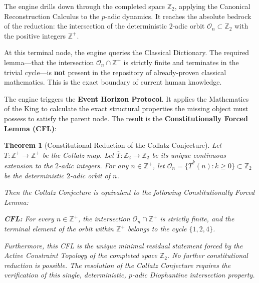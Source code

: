 \documentclass[12pt,openany]{extbook}
\theoremstyle{plain}
\newtheorem{theorem}{Theorem}[chapter]
\theoremstyle{definition}
\begin{document}
The engine drills down through the completed space $\mathbb{Z}_2$, applying the Canonical Reconstruction Calculus to the $p$-adic dynamics. It reaches the absolute bedrock of the reduction: the intersection of the deterministic $2$-adic orbit $\mathcal{O}_n \subset \mathbb{Z}_2$ with the positive integers $\mathbb{Z}^+$.

At this terminal node, the engine queries the Classical Dictionary. The required lemma---that the intersection $\mathcal{O}_n \cap \mathbb{Z}^+$ is strictly finite and terminates in the trivial cycle---is \textbf{not} present in the repository of already-proven classical mathematics. This is the exact boundary of current human knowledge.

The engine triggers the \textbf{Event Horizon Protocol}. It applies the Mathematics of the King to calculate the exact structural properties the missing object must possess to satisfy the parent node. The result is the \textbf{Constitutionally Forced Lemma (CFL)}:

\vspace{\intextsep}
\noindent\hrulefill
\vspace{\intextsep}

\begin{theorem}[Constitutional Reduction of the Collatz Conjecture]
Let $T: \mathbb{Z}^+ \to \mathbb{Z}^+$ be the Collatz map. Let $\overline{T}: \mathbb{Z}_2 \to \mathbb{Z}_2$ be its unique continuous extension to the $2$-adic integers. For any $n \in \mathbb{Z}^+$, let $\mathcal{O}_n = \{\overline{T}^k(n) : k \ge 0\} \subset \mathbb{Z}_2$ be the deterministic $2$-adic orbit of $n$.

Then the Collatz Conjecture is equivalent to the following Constitutionally Forced Lemma:

\textbf{CFL:} \emph{For every $n \in \mathbb{Z}^+$, the intersection $\mathcal{O}_n \cap \mathbb{Z}^+$ is strictly finite, and the terminal element of the orbit within $\mathbb{Z}^+$ belongs to the cycle $\{1, 2, 4\}$.}

Furthermore, this CFL is the unique minimal residual statement forced by the Active Constraint Topology of the completed space $\mathbb{Z}_2$. No further constitutional reduction is possible. The resolution of the Collatz Conjecture requires the verification of this single, deterministic, $p$-adic Diophantine intersection property.
\end{theorem}

\vspace{\intextsep}
\noindent\hrulefill
\vspace{\intextsep}
\end{document}
